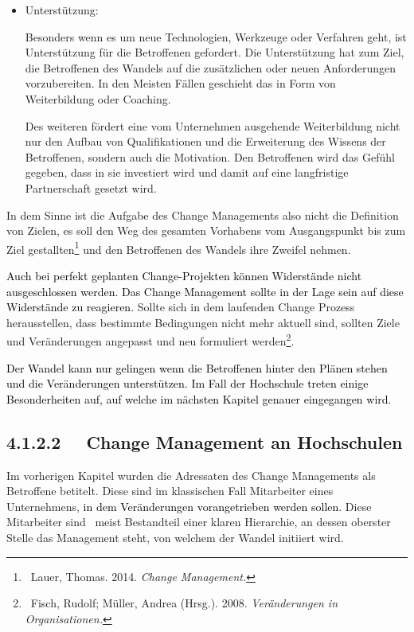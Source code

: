 \documentclass[a4paper]{article}
\begin{document}
\begin{itemize}
\bigskip
\item {\sffamily
Unterstützung:}

{\sffamily
Besonders wenn es um neue Technologien, Werkzeuge oder Verfahren geht, ist Unterstützung für die Betroffenen gefordert.
Die Unterstützung hat zum Ziel, die Betroffenen des Wandels auf die zusätzlichen oder neuen Anforderungen
vorzubereiten. In den Meisten Fällen geschieht das in Form von Weiterbildung oder Coaching. }


\bigskip

{\sffamily
Des weiteren fördert eine vom Unternehmen ausgehende Weiterbildung nicht nur den Aufbau von Qualifikationen und die
Erweiterung des Wissens der Betroffenen, sondern auch die Motivation. Den Betroffenen wird das Gefühl gegeben, dass in
sie investiert wird und damit auf eine langfristige Partnerschaft gesetzt wird. }
\end{itemize}

\bigskip

{\sffamily
In dem Sinne ist die Aufgabe des Change Managements also nicht die Definition von Zielen, es soll den Weg des gesamten
Vorhabens vom Ausgangspunkt bis zum Ziel gestallten\footnote{\textsf{\ Lauer, Thomas. 2014.
}\textsf{\textit{\textcolor[rgb]{0.06666667,0.06666667,0.06666667}{Change Management.}}}} und den Betroffenen des
Wandels ihre Zweifel nehmen. }


\bigskip

{\sffamily
\textcolor{black}{Auch bei perfekt geplanten Change-Projekten können Widerstände nicht ausgeschlossen werden. Das Change
Management sollte in der Lage sein auf diese Widerstände zu reagieren. }Sollte sich in dem laufenden Change Prozess
herausstellen, dass bestimmte Bedingungen nicht mehr aktuell sind, sollten Ziele und Veränderungen angepasst und neu
formuliert werden\footnote{\textcolor[rgb]{0.12941177,0.11764706,0.11764706}{\ Fisch, Rudolf; Müller, Andrea (Hrsg.).
2008. }\textit{\textcolor[rgb]{0.12941177,0.11764706,0.11764706}{Veränderungen in Organisationen.}}}. \ }


\bigskip

{\sffamily
\textcolor{black}{Der Wandel kann nur gelingen wenn die Betroffenen hinter den Plänen stehen und }\textcolor{black}{die
Veränderungen unterstützen. Im Fall der Hochschule treten einige Besonderheiten auf, auf welche im nächsten Kapitel
genauer eingegangen wird. }\ }

\subsection[4.1.2.2 \ \ Change Management an Hochschulen]{\bfseries 4.1.2.2 \ \ Change Management an Hochschulen}
{\sffamily
Im vorherigen Kapitel wurden die Adressaten des Change Managements als Betroffene betitelt. Diese sind im klassischen
Fall Mitarbeiter eines Unternehmens, \textcolor{black}{in dem Veränderungen vorangetrieben werden sollen.} Diese
Mitarbeiter sind \ meist Bestandteil einer klaren Hierarchie, an dessen oberster Stelle das Management steht, von
welchem der Wandel initiiert wird. }
\end{document}
